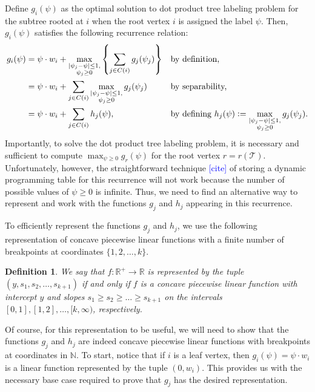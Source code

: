 \documentclass[10pt]{article}
\newtheorem{definition}{Definition}
\newcommand{\henri}[1]{\textcolor{blue}{[#1]}}
\newcommand{\tree}{\mathcal{T}}
\newcommand{\defeq}{\vcentcolon=}
\begin{document}
Define $g_{i}(\psi)$ as the optimal solution to dot product tree labeling problem for the subtree rooted at $i$
when the root vertex $i$ is assigned the label $\psi$. Then, $g_{i}(\psi)$ satisfies the following recurrence relation:
\begin{align}
    g_{i}(\psi) &= \psi\cdot w_i + \max_{\substack{\lvert \psi_j - \psi \rvert \leq 1,\\\psi_j \geq 0}} \left\{\sum_{j \in C(i)} g_{j}(\psi_j)\right\} &&\text{by definition,} \nonumber\\
                &= \psi\cdot w_i + \sum_{j \in C(i)}\max_{\substack{\lvert \psi_j - \psi \rvert \leq 1,\\\psi_j \geq 0}} g_{j}(\psi_j) &&\text{by separability,} \nonumber\\
                &= \psi\cdot w_i + \sum_{j \in C(i)}h_j(\psi), &&\text{by defining } h_j(\psi) \defeq \max_{\substack{\lvert \psi_j - \psi \rvert \leq 1,\\\psi_j \geq 0}} g_{j}(\psi_j).
\end{align}
Importantly, to solve the dot product tree labeling problem, it is necessary and sufficient 
to compute $\max_{\psi \geq 0}g_r(\psi)$ for the root vertex $r = r(\tree)$. Unfortunately, however,
the straightforward technique \henri{cite} of storing a dynamic programming table for this recurrence will not
work because the number of possible values of $\psi \geq 0$ is infinite. Thus, we need to find an alternative way to
represent and work with the functions $g_j$ and $h_j$ appearing in this recurrence.

To efficiently represent the functions $g_j$ and $h_j$, we use the
following representation of concave piecewise linear functions with
a finite number of breakpoints at coordinates $\{1, 2, \ldots, k\}$. 
\begin{definition}
    \label{def:g_form}
    We say that $f : \mathbb{R}^+ \rightarrow \mathbb{R}$ 
    is \emph{represented by the tuple} $(y, s_1, s_2, \ldots, s_{k + 1})$ if and only if $f$ is
    a concave piecewise linear function with intercept $y$ and 
    slopes $s_1 \geq s_2 \geq \ldots \geq s_{k + 1}$ on the intervals $[0, 1], [1, 2], \ldots, [k, \infty)$, respectively. 
\end{definition}
Of course, for this representation
to be useful, we will need to show that the functions $g_j$ and $h_j$ are indeed concave 
piecewise linear functions with breakpoints at coordinates in $\mathbb{N}$. 
To start, notice that if $i$ is a leaf vertex, then $g_{i}(\psi) = \psi\cdot w_i$ is 
a linear function represented by the tuple $(0, w_i)$. This provides us with the  
necessary base case required to prove that $g_j$ has the desired representation.
\end{document}
